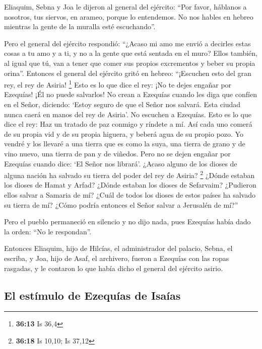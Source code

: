  Eliaquim, Sebna y Joa le dijeron al general del
ejército: ``Por favor, háblanos a nosotros, tus siervos, en arameo,
porque lo entendemos. No nos hables en hebreo mientras la gente de la
muralla esté escuchando''.

 Pero el general del ejército respondió: ``¿Acaso mi amo
me envió a decirles estas cosas a tu amo y a ti, y no a la gente que
está sentada en el muro? Ellos también, al igual que tú, van a tener que
comer sus propios excrementos y beber su propia orina''. 
Entonces el general del ejército gritó en hebreo: ``¡Escuchen esto del
gran rey, el rey de Asiria! \footnote{\textbf{36:13} Is 36,4}
 Esto es lo que dice el rey: ¡No te dejes engañar por
Ezequías! ¡Él no puede salvarlos!  No crean a Ezequías
cuando les diga que confíen en el Señor, diciendo: `Estoy seguro de que
el Señor nos salvará. Esta ciudad nunca caerá en manos del rey de
Asiria'.  No escuchen a Ezequías. Esto es lo que dice el
rey: Haz un tratado de paz conmigo y ríndete a mí. Así cada uno comerá
de su propia vid y de su propia higuera, y beberá agua de su propio
pozo.  Yo vendré y los llevaré a una tierra que es como
la suya, una tierra de grano y de vino nuevo, una tierra de pan y de
viñedos.  Pero no se dejen engañar por Ezequías cuando
dice: `El Señor nos librará'. ¿Acaso alguno de los dioses de alguna
nación ha salvado su tierra del poder del rey de Asiria? \footnote{\textbf{36:18}
  Is 10,10; Is 37,12}  ¿Dónde estaban los dioses de Hamat
y Arfad? ¿Dónde estaban los dioses de Sefarvaim? ¿Pudieron ellos salvar
a Samaria de mí?  ¿Cuál de todos los dioses de estos
países ha salvado su tierra de mí? ¿Cómo podría entonces el Señor salvar
a Jerusalén de mí?''

 Pero el pueblo permaneció en silencio y no dijo nada,
pues Ezequías había dado la orden: ``No le respondan''.

 Entonces Eliaquim, hijo de Hilcías, el administrador del
palacio, Sebna, el escriba, y Joa, hijo de Asaf, el archivero, fueron a
Ezequías con las ropas rasgadas, y le contaron lo que había dicho el
general del ejército asirio.

\hypertarget{el-estuxedmulo-de-ezequuxedas-de-isauxedas}{%
\subsection{El estímulo de Ezequías de
Isaías}\label{el-estuxedmulo-de-ezequuxedas-de-isauxedas}}

